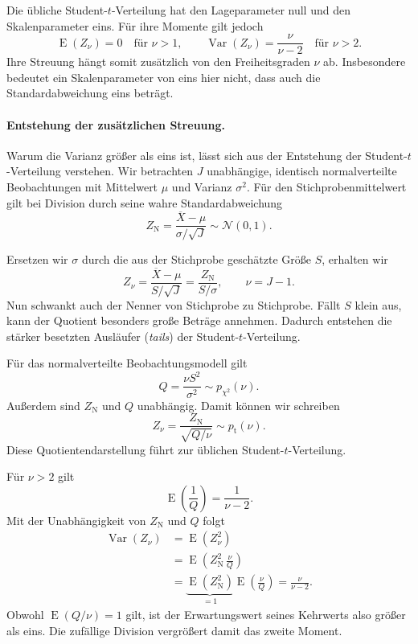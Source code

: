 Die übliche Student-$t$-Verteilung hat den Lageparameter null und
den Skalenparameter eins. Für ihre Momente gilt jedoch
\begin{equation}
\operatorname E(Z_\nu)=0
\quad\text{für }\nu>1,
\qquad
\operatorname{Var}(Z_\nu)=\frac{\nu}{\nu-2}
\quad\text{für }\nu>2.
\end{equation}
Ihre Streuung hängt somit zusätzlich von den Freiheitsgraden $\nu$ ab.
Insbesondere bedeutet ein Skalenparameter von eins hier nicht,
dass auch die Standardabweichung eins beträgt.

\paragraph{Entstehung der zusätzlichen Streuung.}

Warum die Varianz größer als eins ist, lässt sich aus der
Entstehung der Student-$t$-Verteilung verstehen.
Wir betrachten $J$ unabhängige, identisch normalverteilte
Beobachtungen mit Mittelwert $\mu$ und Varianz $\sigma^2$.
Für den Stichprobenmittelwert gilt bei Division durch seine
wahre Standardabweichung
\begin{equation}
Z_{\mathrm N}
=
\frac{\overline X-\mu}{\sigma/\sqrt J}
\sim\mathcal N(0,1).
\end{equation}

Ersetzen wir $\sigma$ durch die aus der Stichprobe geschätzte
Größe $S$, erhalten wir
\begin{equation}
Z_\nu
=
\frac{\overline X-\mu}{S/\sqrt J}
=
\frac{Z_{\mathrm N}}{S/\sigma},
\qquad \nu=J-1.
\end{equation}
Nun schwankt auch der Nenner von Stichprobe zu Stichprobe.
Fällt $S$ klein aus, kann der Quotient besonders große Beträge
annehmen. Dadurch entstehen die stärker besetzten Ausläufer
(\textsl{tails}) der Student-$t$-Verteilung.

Für das normalverteilte Beobachtungsmodell gilt
\begin{equation}
Q=\frac{\nu S^2}{\sigma^2}\sim p_{\chi^2}(\nu).
\end{equation}
Außerdem sind $Z_{\mathrm N}$ und $Q$ unabhängig.
Damit können wir schreiben
\begin{equation}
Z_\nu
=
\frac{Z_{\mathrm N}}{\sqrt{Q/\nu}}
\sim p_\mathrm{t}(\nu).
\end{equation}
Diese Quotientendarstellung führt zur üblichen
Student-$t$-Verteilung.

Für $\nu>2$ gilt
\begin{equation}
\operatorname E\!\left(\frac{1}{Q}\right)
=
\frac{1}{\nu-2}.
\end{equation}
Mit der Unabhängigkeit von $Z_{\mathrm N}$ und $Q$ folgt
\begin{align}
\operatorname{Var}(Z_\nu)
&=
\operatorname E(Z_\nu^2)
\\
&=
\operatorname E\!\left(
Z_{\mathrm N}^2\,\frac{\nu}{Q}
\right)
\\
&=
\underbrace{\operatorname E(Z_{\mathrm N}^2)}_{=1}
\operatorname E\!\left(\frac{\nu}{Q}\right)
=
\frac{\nu}{\nu-2}.
\end{align}
Obwohl $\operatorname E(Q/\nu)=1$ gilt, ist der Erwartungswert
seines Kehrwerts also größer als eins.
Die zufällige Division vergrößert damit das zweite Moment.

